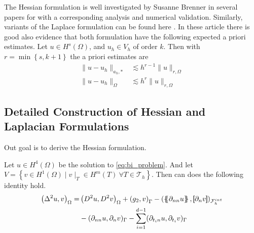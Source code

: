 The Hessian formulation is well investigated by Susanne Brenner in several papers for \cite{brenner2012, brenner2012quadratic, brenner2012quadratic_kirk} with a corresponding analysis and numerical validation. Similarly, variants of the Laplace formulation can be found here
\cite{feng2007fully, georgoulis2009discontinuous}. In these article there is good also evidence  that both formulation have the following expected a priori estimates. Let  $u \in H^{s}( \Omega ) $, and $u_{h}\in  V_{h}  $ of order $k$. Then with $r = \min\left\{ s,
k+1 \right\}$ the a priori estimates are   \[
    \begin{split}
\| u - u_{h} \|_{ a_{h},*  }^{  }  & \lesssim  h^{r-1} \| u \|_{ r, \Omega  }^{  } \\
\| u - u_{h} \|_{ \Omega   }^{  }  & \lesssim  h^{r} \| u \|_{ r,\Omega  }^{  }
    \end{split}
\]

\subsection{Detailed Construction of Hessian and Laplacian Formulations }%
\label{sub:construction_of_laplacian_cip}

Out goal is to derive the Hessian formulation.

\begin{lemma}
Let $u \in H^{4}( \Omega ) $ be the solution to \eqref{eq:bi_problem}.  And let $V = \left\{ v \in H^{1}( \Omega )  \mid  v \mid _{T} \in H^{m}( T) \ \forall T \in \mathcal{T} _{h}   \right\} $. Then can does the following identity hold.
\begin{equation}
\label{eq:bi_basic_dg_full_1}
\begin{split}
    \left( \Delta  ^{2} u, v \right) _{\Omega }  =&   \left( D^2u, D^2v \right)_{\Omega } +  \left(g_{2}, v  \right) _{ \Gamma  }  -  ( \mean{ \partial _{nn} u }   , \jump{ \partial_{n} v } )_{\mathcal{F}_{h}^{int} } \\
                                                  &  - ( \partial _{nn} u , \partial _{n} v)_{\Gamma  } - \sum_{i =1  }^{d-1} ( \partial   _{t_{i}n} u  ,  \partial   _{t_{i}}  v  )_{ \Gamma   }
\end{split}
\end{equation}

\end{lemma}

